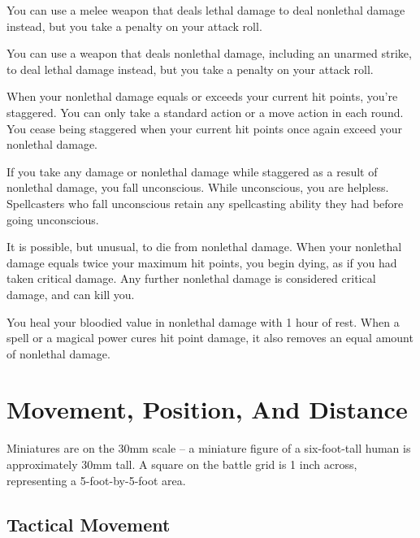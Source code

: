  You can use a melee weapon that deals lethal damage to deal nonlethal damage instead, but you take a  penalty on your attack roll.

 You can use a weapon that deals nonlethal damage, including an unarmed strike, to deal lethal damage instead, but you take a  penalty on your attack roll.

 When your nonlethal damage equals or exceeds your current hit points, you're staggered. You can only take a standard action or a move action in each round. You cease being staggered when your current hit points once again exceed your nonlethal damage.

If you take any damage or nonlethal damage while staggered as a result of nonlethal damage, you fall unconscious. While unconscious, you are helpless. Spellcasters who fall unconscious retain any spellcasting ability they had before going unconscious.

It is possible, but unusual, to die from nonlethal damage. When your nonlethal damage equals twice your maximum hit points, you begin dying, as if you had taken critical damage. Any further nonlethal damage is considered critical damage, and can kill you.

 You heal your bloodied value in nonlethal damage with 1 hour of rest. When a spell or a magical power cures hit point damage, it also removes an equal amount of nonlethal damage.

\section{Movement, Position, And Distance}

Miniatures are on the 30mm scale -- a miniature figure of a six-foot-tall human is approximately 30mm tall. A square on the battle grid is 1 inch across, representing a 5-foot-by-5-foot area.

\subsection{Tactical Movement}

